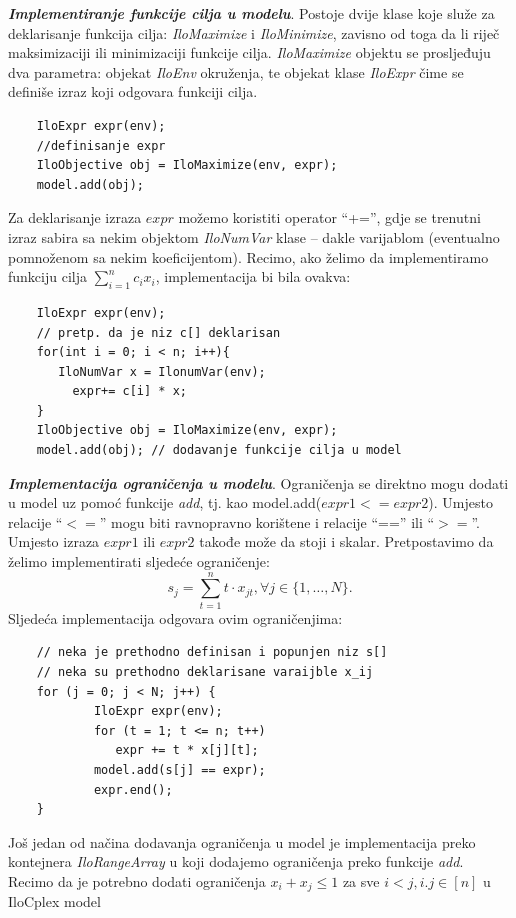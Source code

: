 \documentclass[a4paper, utf8, 11pt, colorlinks]{book}
\begin{document}
 \noindent \textbf{\emph{Implementiranje funkcije cilja u modelu}}. 
 Postoje dvije klase koje služe za deklarisanje funkcija cilja: \emph{IloMaximize} i \emph{IloMinimize}, zavisno od toga da li riječ maksimizaciji ili minimizaciji funkcije cilja.  \emph{IloMaximize} objektu se prosljeđuju dva parametra: objekat \emph{IloEnv} okruženja, te objekat klase \emph{IloExpr} čime se definiše  izraz koji odgovara funkciji cilja. 
 
 \begin{verbatim}
 	IloExpr expr(env);
 	//definisanje expr
 	IloObjective obj = IloMaximize(env, expr);
 	model.add(obj);
 \end{verbatim}
 
 \noindent Za deklarisanje izraza $expr$ možemo koristiti operator  ``+='', gdje se trenutni izraz sabira sa nekim objektom \emph{IloNumVar} klase -- dakle varijablom (eventualno pomnoženom sa nekim koeficijentom). 
 Recimo, ako želimo da implementiramo funkciju cilja $\sum_{i=1}^n c_i x_i$, implementacija bi bila ovakva:
 
 \begin{verbatim}
 	IloExpr expr(env);
 	// pretp. da je niz c[] deklarisan
 	for(int i = 0; i < n; i++){
       IloNumVar x = IlonumVar(env);
 	     expr+= c[i] * x;
 	}
 	IloObjective obj = IloMaximize(env, expr);
 	model.add(obj); // dodavanje funkcije cilja u model
 \end{verbatim}
 
 \noindent \textbf{\emph{Implementacija ograničenja u modelu}}. Ograničenja se direktno mogu dodati  u model uz pomoć funkcije \emph{add}, tj. kao 
 model.add($expr1 <= expr2$). Umjesto relacije ``$<=$'' mogu biti ravnopravno korištene i relacije ``=='' ili ``$>=$''. Umjesto izraza $expr1$ ili $expr2$ takođe može da stoji i skalar. Pretpostavimo da želimo implementirati sljedeće ograničenje:
 $$s_j = \sum_{t=1}^n t \cdot x_{jt}, \forall j \in \{1,\ldots,N\}.$$ 
 Sljedeća implementacija odgovara ovim ograničenjima: 
 \begin{verbatim}
 	// neka je prethodno definisan i popunjen niz s[]
 	// neka su prethodno deklarisane varaijble x_ij
 	for (j = 0; j < N; j++) {
 		    IloExpr expr(env);
 		    for (t = 1; t <= n; t++)
 	  	       expr += t * x[j][t];            
 		    model.add(s[j] == expr);
 		    expr.end();
 	}
 \end{verbatim}
 Još jedan od načina dodavanja ograničenja u model je implementacija preko kontejnera \emph{IloRangeArray} u koji dodajemo ograničenja preko funkcije \emph{add}.   
 Recimo da je potrebno dodati ograničenja $x_i + x_j \leq 1$ za sve $i<j, i.j \in [n]$ u IloCplex model
 
\end{document}
